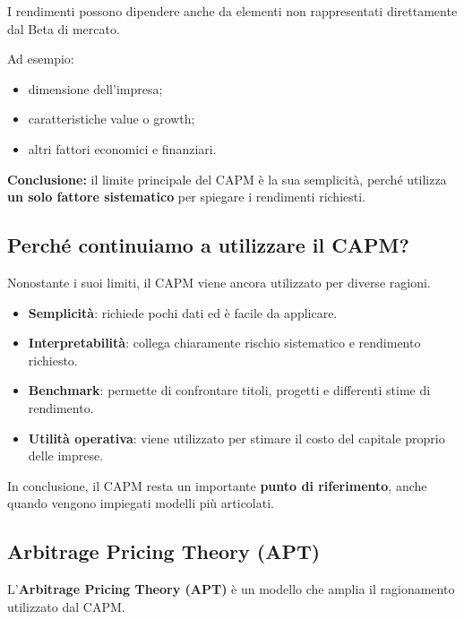 \noindent I rendimenti possono dipendere
anche da elementi non rappresentati
direttamente dal Beta di mercato.

\medskip

\noindent Ad esempio:

\begin{itemize}
    \item dimensione dell'impresa;
    \item caratteristiche value o growth;
    \item altri fattori economici e finanziari.
\end{itemize}

\noindent \textbf{Conclusione:} il limite principale
del CAPM è la sua semplicità, perché utilizza
\textbf{un solo fattore sistematico}
per spiegare i rendimenti richiesti.


\subsection{Perché continuiamo a utilizzare il CAPM?}

\noindent Nonostante i suoi limiti,
il CAPM viene ancora utilizzato
per diverse ragioni.

\begin{itemize}
    \item \textbf{Semplicità}: richiede pochi dati
    ed è facile da applicare.

    \item \textbf{Interpretabilità}: collega
    chiaramente rischio sistematico
    e rendimento richiesto.

    \item \textbf{Benchmark}: permette
    di confrontare titoli, progetti
    e differenti stime di rendimento.

    \item \textbf{Utilità operativa}: viene
    utilizzato per stimare il costo
    del capitale proprio delle imprese.
\end{itemize}

\noindent In conclusione, il CAPM resta
un importante \textbf{punto di riferimento},
anche quando vengono impiegati
modelli più articolati.


\subsection{Arbitrage Pricing Theory (APT)}

\noindent L'\textbf{Arbitrage Pricing Theory (APT)}
è un modello che amplia il ragionamento
utilizzato dal CAPM.

